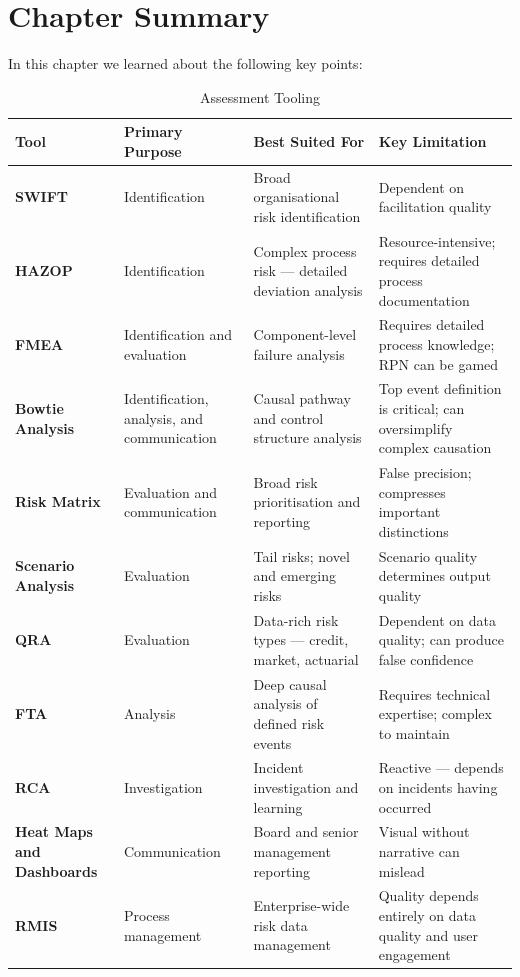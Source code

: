 \section{Chapter Summary}
In this chapter we learned about the following key points:
\begin{table}[H]
  \centering
  \renewcommand{\arraystretch}{1.5}
  \begin{tabularx}{\textwidth}{ | >{\raggedright\arraybackslash}p{} 
								| >{\raggedright\arraybackslash}p{} 
								| >{\raggedright\arraybackslash}p{} 
                                | >{\raggedright\arraybackslash}X | }
    \hline
    \textbf{Tool} & \textbf{Primary Purpose} & \textbf{Best Suited For} & \textbf{Key Limitation} \\
    \hline
    \textbf{SWIFT} & Identification & Broad organisational risk identification & Dependent on facilitation quality\\
    \hline
    \textbf{HAZOP} & Identification & Complex process risk — detailed deviation analysis & Resource-intensive; requires detailed process documentation\\
    \hline
    \textbf{FMEA} & Identification and evaluation & Component-level failure analysis & Requires detailed process knowledge; RPN can be gamed\\
    \hline
    \textbf{Bowtie Analysis} & Identification, analysis, and communication & Causal pathway and control structure analysis & Top event definition is critical; can oversimplify complex causation\\
    \hline
    \textbf{Risk Matrix} & Evaluation and communication & Broad risk prioritisation and reporting & False precision; compresses important distinctions\\
    \hline
    \textbf{Scenario Analysis} & Evaluation & Tail risks; novel and emerging risks & Scenario quality determines output quality\\
    \hline
    \textbf{QRA} & Evaluation & Data-rich risk types — credit, market, actuarial & Dependent on data quality; can produce false confidence\\
    \hline
    \textbf{FTA} & Analysis & Deep causal analysis of defined risk events & Requires technical expertise; complex to maintain\\
    \hline
    \textbf{RCA} & Investigation & Incident investigation and learning & Reactive — depends on incidents having occurred\\
    \hline
    \textbf{Heat Maps and Dashboards} & Communication & Board and senior management reporting & Visual without narrative can mislead\\
    \hline
    \textbf{RMIS} & Process management & Enterprise-wide risk data management & Quality depends entirely on data quality and user engagement\\
    \hline
  \end{tabularx}
  \caption{Assessment Tooling}
\end{table}

